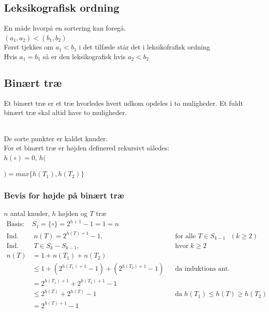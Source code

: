 \documentclass[12pt, a4paper]{article}
\begin{document}
				\subsection{Leksikografisk ordning}
					En måde hvorpå en sortering kan foregå.\\
					$(a_1,a_2)<(b_1,b_2)$\\
					Først tjekkes om $a_1<b_1$ i det tilfæde står det i leksikofrafisk ordning\\
					Hvis $a_1=b_1$ så er den leksikografisk hvis $a_2<b_2$
				\subsection{Binært træ}
					Et binært træ er et træ hvorledes hvert udkom opdeles i to muligheder. Et fuldt binært træ skal altid have to muligheder.\\
					\\
					De sorte punkter er kaldet knuder.\\
					For et binært træ er højden definered rekursivt således: \\$h(\circ )=0$, $h($$)=max\{h(T_1),h(T_2)\}$\\
					\subsubsection{Bevis for højde på binært træ}
						$n$ antal knuder, $h$ højden og $T$ træ
						\begin{align*}
							\text{Basis:}\;& S_1=\{\circ\} = 2^{h+1}-1=1=n\\
							\text{Ind. ant:}&\;n(T)=2^{h(T)+1}-1, &&\text{for alle $T\in S_{k-1}$ $(k\geq2)$}\\
							\text{Ind. skridt:}&\; T\in S_k-S_{k-1}, &&\text{hvor}\; k\geq 2\\[4mm]
							n(T)&=1+n(T_1)+n(T_2)\\
							&\leq 1 + (2^{h(T_1)+1}-1)+(2^{h(T_2)+1}-1)&&\text{da induktions ant.}\\
							&=2^{h(T_1)+1}+2^{h(T_2)+1}-1\\
							&\leq 2^{h(T)}+2^{h(T)}-1 &&\text{da}\; h(T_1)\leq h(T) \geq h(T_2)\\
							&=2^{h(T)+1}-1
						\end{align*}
\end{document}
